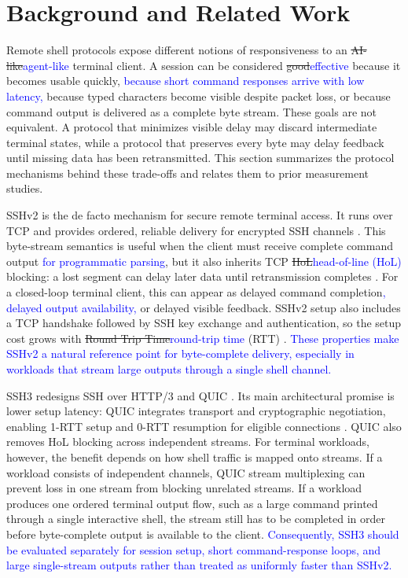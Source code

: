 \section{Background and Related Work}
\label{sec:background}
Remote shell protocols expose different notions of responsiveness to an \sout{AI-like}\textcolor{blue}{agent-like} terminal client. A session can be considered \sout{good}\textcolor{blue}{effective} because it becomes usable quickly, \textcolor{blue}{because short command responses arrive with low latency,} because typed characters become visible despite packet loss, or because command output is delivered as a complete byte stream. These goals are not equivalent. A protocol that minimizes visible delay may discard intermediate terminal states, while a protocol that preserves every byte may delay feedback until missing data has been retransmitted. This section summarizes the protocol mechanisms behind these trade-offs and relates them to prior measurement studies.

SSHv2 \cite{Ylonen2006RFC4251} is the de facto mechanism for secure remote terminal access. It runs over TCP and provides ordered, reliable delivery for encrypted SSH channels \cite{Bellare2002}. This byte-stream semantics is useful when the client must receive complete command output \textcolor{blue}{for programmatic parsing}, but it also inherits TCP \sout{HoL}\textcolor{blue}{head-of-line (HoL)} blocking: a lost segment can delay later data until retransmission completes \cite{Scharf2007}. For a closed-loop terminal client, this can appear as delayed command completion\textcolor{blue}{, delayed output availability,} or delayed visible feedback. SSHv2 setup also includes a TCP handshake followed by SSH key exchange and authentication, so the setup cost grows with \sout{Round Trip Time}\textcolor{blue}{round-trip time} (RTT) \cite{Ylonen2006RFC4253}. \textcolor{blue}{These properties make SSHv2 a natural reference point for byte-complete delivery, especially in workloads that stream large outputs through a single shell channel.}

SSH3 redesigns SSH over HTTP/3 and QUIC \cite{michel2023}. Its main architectural promise is lower setup latency: QUIC integrates transport and cryptographic negotiation, enabling 1-RTT setup and 0-RTT resumption for eligible connections \cite{Iyengar2021}. QUIC also removes HoL blocking across independent streams. For terminal workloads, however, the benefit depends on how shell traffic is mapped onto streams. If a workload consists of independent channels, QUIC stream multiplexing can prevent loss in one stream from blocking unrelated streams. If a workload produces one ordered terminal output flow, such as a large command printed through a single interactive shell, the stream still has to be completed in order before byte-complete output is available to the client. \textcolor{blue}{Consequently, SSH3 should be evaluated separately for session setup, short command-response loops, and large single-stream outputs rather than treated as uniformly faster than SSHv2.}

